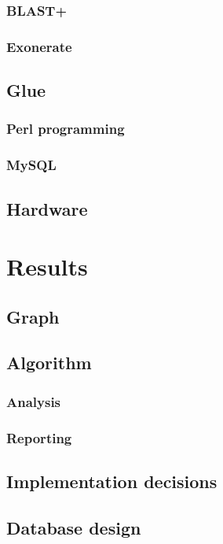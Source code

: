\documentclass[a4paper,13pt]{scrreprt}
\begin{document}
		\subsection{BLAST+}
			
		\subsection{Exonerate}
			
	\section{Glue}
		\subsection{Perl programming}
			
		\subsection{MySQL}
			
	\section{Hardware}
		

\chapter{Results}
	\section{Graph}
		
	\section{Algorithm}
		\subsection{Analysis}
			
		\subsection{Reporting}
			
	\section{Implementation decisions}
		
	\section{Database design}
		
\end{document}
